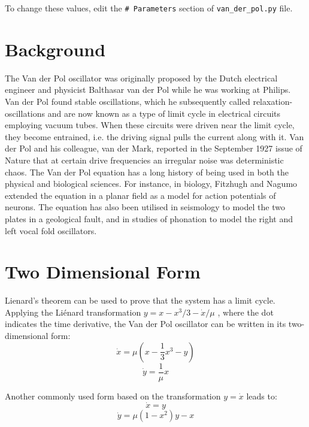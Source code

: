 \documentclass[12pt, a4paper]{article}
\begin{document}
To change these values, edit the \texttt{\# Parameters} section of \texttt{van\_der\_pol.py} file.

\section{Background}
The Van der Pol oscillator was originally proposed by the Dutch electrical engineer and physicist Balthasar van der Pol while he was working at Philips.\cite{wiki:1} Van der Pol found stable oscillations, which he subsequently called relaxation-oscillations\cite{wiki:3} and are now known as a type of limit cycle in electrical circuits employing vacuum tubes. When these circuits were driven near the limit cycle, they become entrained, i.e. the driving signal pulls the current along with it. Van der Pol and his colleague, van der Mark, reported in the September 1927 issue of Nature that at certain drive frequencies an irregular noise was deterministic chaos.\cite{wiki:5}
The Van der Pol equation has a long history of being used in both the physical and biological sciences. For instance, in biology, Fitzhugh and Nagumo extended the equation in a planar field as a model for action potentials of neurons. The equation has also been utilised in seismology to model the two plates in a geological fault, and in studies of phonation to model the right and left vocal fold oscillators.

\section{Two Dimensional Form}
Lienard's theorem can be used to prove that the system has a limit cycle. Applying the Liénard transformation $y = x- x^3/3 - \dot{x}/\mu$ , where the dot indicates the time derivative, the Van der Pol oscillator can be written in its two-dimensional form:
\begin{equation} \label{2dformx}
\dot{x} = \mu\left(x - \frac{1}{3}x^3 - y \right)
\end{equation}
\begin{equation} \label{2dformy}
\dot{y} = \frac{1}{\mu}x
\end{equation}

Another commonly used form based on the transformation $ y = \dot{x} $ leads to:
\begin{equation} \label{2dform2xnew}
\dot{x} = y
\end{equation}
\begin{equation} \label{2dform2ynew}
\dot{y} = \mu(1-x^2)y - x
\end{equation}
\end{document}
